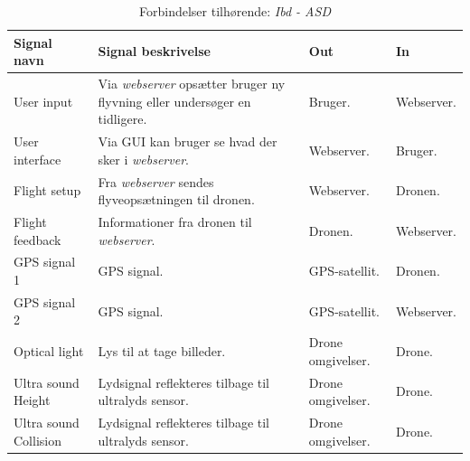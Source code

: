 \begin{table}[H]
	\centering
		\begin{tabular}{|p{2.6 cm}|p{4.9 cm}|p{2.5 cm}|p{2.5 cm}|} 
		\hline
			\textbf{Signal navn} 	& \textbf{Signal beskrivelse}		& \textbf{Out} 				& \textbf{In}     \\ \hline
			User input 			& Via \textit{webserver} opsætter \newline bruger ny flyvning eller undersøger en tidligere. & Bruger. 		& Webserver.			    \\ \hline
			User interface 		& Via GUI kan bruger se hvad der sker i \textit{webserver}.	& Webserver.			& Bruger.				\\ \hline
			Flight setup		& Fra \textit{webserver} sendes \newline flyveopsætningen til dronen.	& Webserver.	& Dronen.	\\ \hline
			Flight feedback		& Informationer fra dronen \newline til \textit{webserver}.	& 	Dronen.		& Webserver.			    \\ \hline
			GPS signal 1		& GPS signal.	& GPS-satellit.			& Dronen.				\\ \hline
			GPS signal 2		& GPS signal.	& GPS-satellit.				& Webserver.	\\ \hline  
			Optical light		& Lys til at tage billeder.	& Drone \newline omgivelser.				& Drone.	\\ \hline 
			Ultra sound \newline Height		& Lydsignal reflekteres tilbage til ultralyds sensor.	& Drone \newline omgivelser.				& Drone.	\\ \hline 
			Ultra sound \newline Collision		& Lydsignal reflekteres tilbage til ultralyds sensor.	& Drone \newline omgivelser.				& Drone.	\\ \hline 
		\end{tabular}
	\caption{Forbindelser tilhørende: \textit{Ibd - ASD}}
	\label{tab:IBD1}
\end{table}

